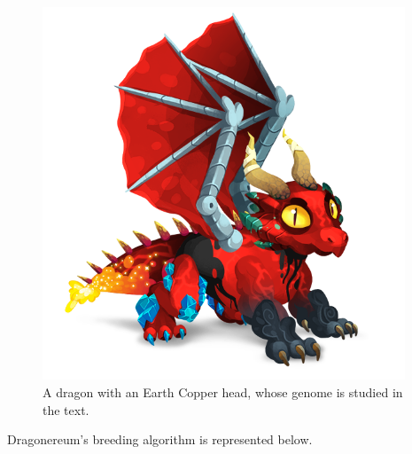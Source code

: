 \documentclass[12pt]{article}
\begin{document}
\begin{Center}

\begin{figure}[H]
	\begin{Center}
		\includegraphics[width=4.26in,height=4.38in]{./media/BGimage28.png}
		\caption{A dragon with an Earth Copper head, whose genome is studied in the text.}
		\label{fig:A_dragon_with_an_Earth_Copper_head_whose_genome_is_studied_in_the_text}
	\end{Center}
\end{figure}


\end{Center}\par

Dragonereum’s breeding algorithm is represented below.\par
\end{document}
